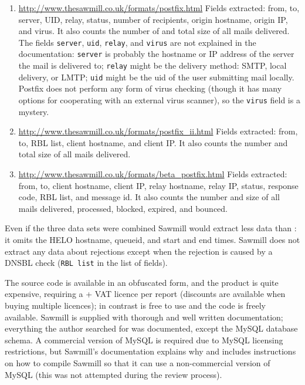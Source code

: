 \begin{enumerate}

    \item \url{http://www.thesawmill.co.uk/formats/postfix.html} \newline{}
        Fields extracted: from, to, server, UID, relay, status, number of
        recipients, origin hostname, origin \gls{IP}, and virus.  It also
        counts the number of and total size of all mails delivered.  The
        fields \texttt{server}, \texttt{uid}, \texttt{relay}, and
        \texttt{virus} are not explained in the documentation:
        \texttt{server} is probably the hostname or \gls{IP} address of the
        server the mail is delivered to; \texttt{relay} might be the
        delivery method: \gls{SMTP}, local delivery, or \gls{LMTP};
        \texttt{uid} might be the uid of the user submitting mail locally.
        Postfix does not perform any form of virus checking (though it has
        many options for cooperating with an external virus scanner), so
        the \texttt{virus} field is a mystery.

    \item \url{http://www.thesawmill.co.uk/formats/postfix_ii.html}
        \newline{} Fields extracted: from, to, RBL list, client hostname,
        and client \gls{IP}\@.  It also counts the number and total size of
        all mails delivered.  

    \item \url{http://www.thesawmill.co.uk/formats/beta_postfix.html}
        \newline{} Fields extracted: from, to, client hostname, client
        \gls{IP}, relay hostname, relay \gls{IP}, status, response code,
        RBL list, and message id.  It also counts the number and size of
        all mails delivered, processed, blocked, expired, and bounced.

\end{enumerate}

Even if the three data sets were combined Sawmill would extract less data
than \parsername{}: it omits the HELO hostname, queueid, and start and end
times.  Sawmill does not extract any data about rejections except when the
rejection is caused by a \gls{DNSBL} check (\texttt{RBL list} in the list
of fields).

The source code is available in an obfuscated form, and the product is
quite expensive, requiring a  + VAT licence per report
(discounts are available when buying multiple licences); in contrast
\parsername{} is free to use and the code is freely available.  Sawmill is
supplied with thorough and well written documentation; everything the
author searched for was documented, except the MySQL database schema.  A
commercial version of MySQL is required due to MySQL licensing
restrictions, but Sawmill's documentation explains why and includes
instructions on how to compile Sawmill so that it can use a non-commercial
version of MySQL (this was not attempted during the review process).


